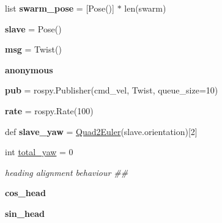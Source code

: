 \begin{DoxyCompactItemize}
list {\bfseries swarm\+\_\+pose} = \mbox{[}Pose()\mbox{]} $\ast$ len(swarm)
\item 
\mbox{\label{namespaceagent__controller_a197ff1b8e39725f9fca34b17bb38e046}} 
{\bfseries slave} = Pose()
\item 
\mbox{\label{namespaceagent__controller_a21f7a1bceed0d377473179942ed410f7}} 
{\bfseries msg} = Twist()
\item 
\mbox{\label{namespaceagent__controller_a7b24afa3606e68565ceaa4a6ca9bbd50}} 
{\bfseries anonymous}
\item 
\mbox{\label{namespaceagent__controller_a07be4f7cec001d2878236ea786649ad7}} 
{\bfseries pub} = rospy.\+Publisher(\textquotesingle{}cmd\+\_\+vel\textquotesingle{}, Twist, queue\+\_\+size=10)
\item 
\mbox{\label{namespaceagent__controller_a729b11b1f868460723947e010610b756}} 
{\bfseries rate} = rospy.\+Rate(100)
\item 
\mbox{\label{namespaceagent__controller_a6f0b0c5fb7c1edc941a504035a9f6f33}} 
def {\bfseries slave\+\_\+yaw} = \hyperlink{namespaceagent__controller_a2a75c52da3a09e2b598dd55a4d4436ec}{Quad2\+Euler}(slave.\+orientation)\mbox{[}2\mbox{]}
\item 
\mbox{\label{namespaceagent__controller_a1ac28018d7a616c8da57a370df4f8aea}} 
int \hyperlink{namespaceagent__controller_a1ac28018d7a616c8da57a370df4f8aea}{total\+\_\+yaw} = 0
\begin{DoxyCompactList}\small\item\em heading alignment behaviour \#\# \end{DoxyCompactList}\item 
\mbox{\label{namespaceagent__controller_ab8d29a87f0460880d00fbce326df51b0}} 
{\bfseries cos\+\_\+head}
\item 
\mbox{\label{namespaceagent__controller_a6db4877daa086817162541d4ef635085}} 
{\bfseries sin\+\_\+head}

\end{DoxyCompactItemize}
